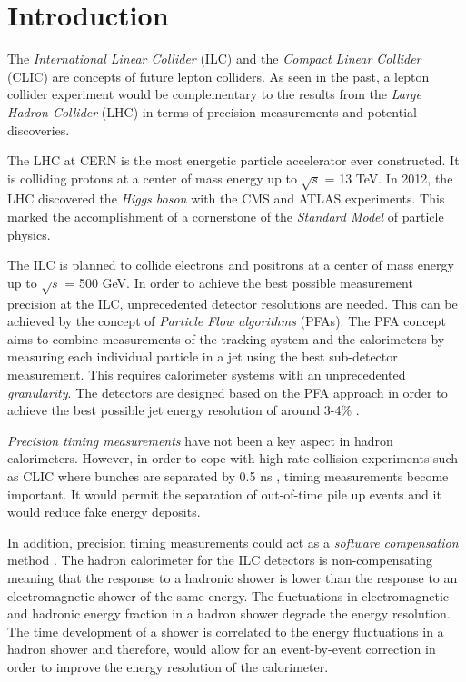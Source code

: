\chapter{Introduction}

The \textit{International Linear Collider} (ILC) and the \textit{Compact Linear Collider} (CLIC) are concepts of future lepton colliders. As seen in the past, a lepton collider experiment would be complementary to the results from the \textit{Large Hadron Collider} (LHC) in terms of precision measurements and potential discoveries.

The LHC at CERN is the most energetic particle accelerator ever constructed. It is colliding protons at a center of mass energy up to $\sqrt{s}$ = 13 TeV. In 2012, the LHC discovered the \textit{Higgs boson} with the CMS and ATLAS experiments. This marked the accomplishment of a cornerstone of the \textit{Standard Model} of particle physics.

The ILC is planned to collide electrons and positrons at a center of mass energy up to $\sqrt{s}$ = 500 GeV. In order to achieve the best possible measurement precision at the ILC, unprecedented detector resolutions are needed. This can be achieved by the concept of \textit{Particle Flow algorithms} (PFAs). The PFA concept aims to combine measurements of the tracking system and the calorimeters by measuring each individual particle in a jet using the best sub-detector measurement. This requires calorimeter systems with an unprecedented \textit{granularity}. The detectors are designed based on the PFA approach in order to achieve the best possible jet energy resolution of around 3-4\% \cite{ILC_TDR_Vol1}.

\textit{Precision timing measurements} have not been a key aspect in hadron calorimeters. However, in order to cope with high-rate collision experiments such as CLIC where bunches are separated by 0.5 ns \cite{CLIC_CDR}, timing measurements become important. It would permit the separation of out-of-time pile up events and it would reduce fake energy deposits.

In addition, precision timing measurements could act as a \textit{software compensation} met\-hod \cite{Benaglia2016}. The hadron calorimeter for the ILC detectors is non-compensating meaning that the response to a hadronic shower is lower than the response to an electromagnetic shower of the same energy. The fluctuations in electromagnetic and hadronic energy fraction in a hadron shower degrade the energy resolution. The time development of a shower is correlated to the energy fluctuations in a hadron shower and therefore, would allow for an event-by-event correction in order to improve the energy resolution of the calorimeter.

